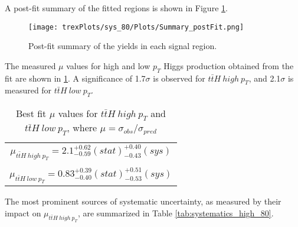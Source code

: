 A post-fit summary of the fitted regions is shown in Figure \ref{fig:Summary80}.

\begin{figure}[H]
    \center
    \texttt{[image: trexPlots/sys\_80/Plots/Summary\_postFit.png]}
    \caption{Post-fit summary of the yields in each signal region.}                                            
    \label{fig:Summary80}
\end{figure}

The measured $\mu$ values for high and low $p_T$ Higgs production obtained from the fit are shown in \ref{tab:mu80}. A significance of 1.7$\sigma$ is observed for $t\bar{t}H\ high\ p_T$, and 2.1$\sigma$ is measured for $t\bar{t}H\ low\ p_T$.

\begin{table}[H]                                                                                                             
  \centering                                                                                                              
  \begin{tabular}{c}                                                                                            
     $\mu_{t\bar{t}H\ high\ p_T} = 2.1^{+0.62}_{-0.59}(stat)^{+0.40}_{-0.43}(sys)$ \\       
     \\
     $\mu_{t\bar{t}H\ low\ p_T} = 0.83^{+0.39}_{-0.40}(stat)^{+0.51}_{-0.53}(sys)$ \\
  \end{tabular}                                                                                                            
  \caption{Best fit $\mu$ values for $t\bar{t}H\ high\ p_T$ and  $t\bar{t}H\ low\ p_T$, where $\mu = \sigma_{obs}/\sigma_{pred}$}
  \label{tab:mu80}                                                                                                  
\end{table}  

The most prominent sources of systematic uncertainty, as measured by their impact on $\mu_{t\bar{t}H\ high\ p_T}$, are summarized in Table \ref{tab:systematics_high_80}.

